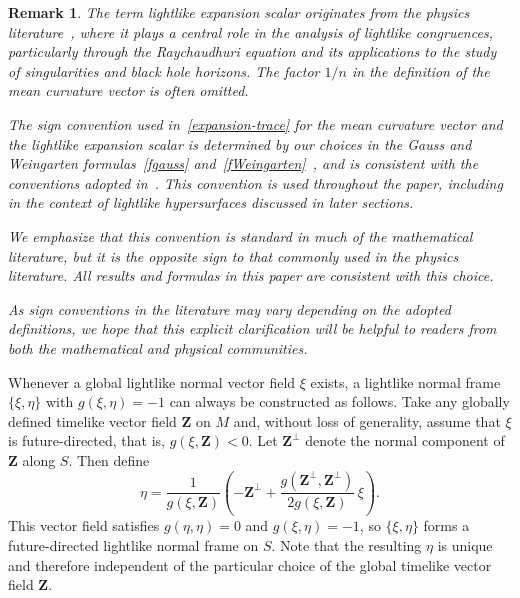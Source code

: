 \documentclass[11pt]{article}
\numberwithin{equation}{section}
\newtheorem{remark}[theorem]{Remark}
\begin{document}
\begin{remark}\normalfont
	The term \emph{lightlike expansion scalar} originates from the physics literature~\cite{beem, HawkingEllis, kriele}, where it plays a central role in the analysis of lightlike congruences, particularly through the Raychaudhuri equation and its applications to the study of singularities and black hole horizons. The factor $1/n$ in the definition of the mean curvature vector is often omitted.
	
	The sign convention used in~\eqref{expansion-trace} for the mean curvature vector and the lightlike expansion scalar is determined by our choices in the Gauss and Weingarten formulas~\eqref{fgauss} and~\eqref{fWeingarten}~\cite{Dajczerbook}, and is consistent with the conventions adopted in~\cite{beem, DuggalGimenez, Duggal_Sahin, HawkingEllis}. This convention is used throughout the paper, including in the context of lightlike hypersurfaces discussed in later sections.
	
	We emphasize that this convention is standard in much of the mathematical literature, but it is the \emph{opposite sign} to that commonly used in the physics literature. All results and formulas in this paper are consistent with this choice.
	
	As sign conventions in the literature may vary depending on the adopted definitions, we hope that this explicit clarification will be helpful to readers from both the mathematical and physical communities.
\end{remark}
	
	
	
Whenever a global lightlike normal vector field $\xi$ exists, a lightlike normal frame $\{\xi, \eta\}$ with $g(\xi, \eta) = -1$ can always be constructed as follows. Take any globally defined timelike vector field $\mathbf{Z}$ on $M$ and, without loss of generality, assume that $\xi$ is future-directed, that is, $g(\xi, \mathbf{Z}) < 0$. Let $\mathbf{Z}^{\perp}$ denote the normal component of $\mathbf{Z}$ along $S$. Then define
\[
\eta = \frac{1}{g(\xi, \mathbf{Z})}\left( -\mathbf{Z}^{\perp} + \frac{g(\mathbf{Z}^{\perp}, \mathbf{Z}^{\perp})}{2g(\xi, \mathbf{Z})}\,\xi\right).
\]
This vector field satisfies $g(\eta, \eta) = 0$ and $g(\xi, \eta) = -1$, so $\{\xi, \eta\}$ forms a future-directed lightlike normal frame on $S$. Note that the resulting $\eta$ is unique and therefore independent of the particular choice of the global timelike vector field $\mathbf{Z}$.
	
\end{document}
